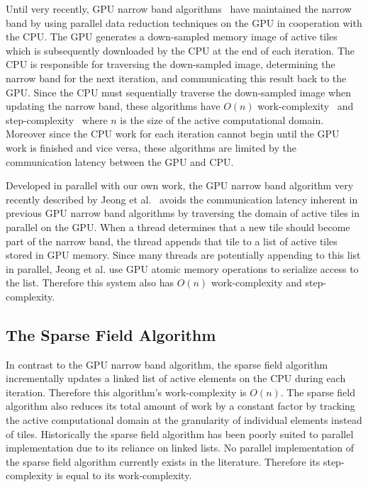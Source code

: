 \documentclass{egpubl}
\begin{document}
Until very recently, GPU narrow band algorithms~\cite{Lefohn-2003-MICCAI,Lefohn-2003-Vis,Cates-2004,Lefohn-2004} have maintained the narrow band by using parallel data reduction techniques on the GPU in cooperation with the CPU. The GPU generates a down-sampled memory image of active tiles which is subsequently downloaded by the CPU at the end of each iteration. The CPU is responsible for traversing the down-sampled image, determining the narrow band for the next iteration, and communicating this result back to the GPU. Since the CPU must sequentially traverse the down-sampled image when updating the narrow band, these algorithms have $O(n)$ work-complexity~\cite{Atallah-1998} and step-complexity~\cite{Nyland-2000} where $n$ is the size of the active computational domain. Moreover since the CPU work for each iteration cannot begin until the GPU work is finished and vice versa, these algorithms are limited by the communication latency between the GPU and CPU.

Developed in parallel with our own work, the GPU narrow band algorithm very recently described by Jeong et al.~\cite{Jeong-2009} avoids the communication latency inherent in previous GPU narrow band algorithms by traversing the domain of active tiles in parallel on the GPU. When a thread determines that a new tile should become part of the narrow band, the thread appends that tile to a list of active tiles stored in GPU memory. Since many threads are potentially appending to this list in parallel, Jeong et al. use GPU atomic memory operations to serialize access to the list. Therefore this system also has $O(n)$ work-complexity and step-complexity.

\subsection{The Sparse Field Algorithm}

In contrast to the GPU narrow band algorithm, the sparse field algorithm~\cite{Whitaker-1998,Peng-1999} incrementally updates a linked list of active elements on the CPU during each iteration. Therefore this algorithm's work-complexity is $O(n)$. The sparse field algorithm also reduces its total amount of work by a constant factor by tracking the active computational domain at the granularity of individual elements instead of tiles. Historically the sparse field algorithm has been poorly suited to parallel implementation due to its reliance on linked lists. No parallel implementation of the sparse field algorithm currently exists in the literature. Therefore its step-complexity is equal to its work-complexity.
\end{document}

